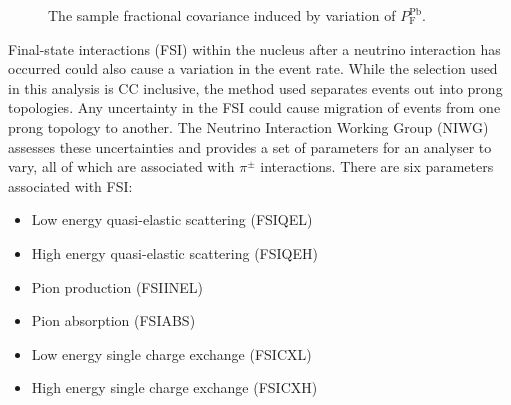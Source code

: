 \begin{figure}%
  \centering
  \caption{The sample fractional covariance induced by variation of $P_{\textrm{F}}^{\textrm{Pb}}$.}
  \label{fig:PbXSecCovarianceMatrices}
\end{figure}
\newline
\newline
Final-state interactions (FSI) within the nucleus after a neutrino interaction has occurred could also cause a variation in the event rate.  While the selection used in this analysis is CC inclusive, the method used separates events out into prong topologies.  Any uncertainty in the FSI could cause migration of events from one prong topology to another.  The Neutrino Interaction Working Group (NIWG) assesses these uncertainties and provides a set of parameters for an analyser to vary, all of which are associated with $\pi^{\pm}$ interactions.  There are six parameters associated with FSI:
\begin{itemize}
  \item Low energy quasi-elastic scattering (FSIQEL)
  \item High energy quasi-elastic scattering (FSIQEH)
  \item Pion production (FSIINEL)
  \item Pion absorption (FSIABS)
  \item Low energy single charge exchange (FSICXL)
  \item High energy single charge exchange (FSICXH)
\end{itemize}
